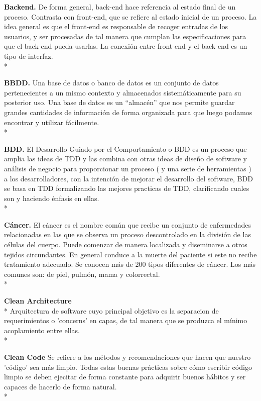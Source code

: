 \documentclass[../pfc.tex]{subfiles}
\begin{document}
	\textbf{Backend.}
	De forma general, back-end hace referencia al estado final de un proceso. Contrasta con front-end, que se refiere al estado inicial de un proceso. 
	La idea general es que el front-end es responsable de recoger entradas de los usuarios, y ser procesadas de tal manera que cumplan las especificaciones para que el back-end pueda usarlas. La conexión entre front-end y el back-end es un tipo de interfaz.\\*
	
	\textbf{BBDD.}
	Una base de datos o banco de datos es un conjunto de datos pertenecientes a un mismo contexto y almacenados sistemáticamente para su posterior uso. Una base de datos es un “almacén” que nos permite guardar grandes cantidades de información de forma organizada para que luego podamos encontrar y utilizar fácilmente.\\*
	
	\textbf{BDD.}
	El Desarrollo Guiado por el Comportamiento o BDD es un proceso que amplia las ideas de TDD y las combina con otras ideas de diseño de software y análisis de negocio para proporcionar un proceso ( y una serie de herramientas ) a los desarrolladores, con la intención de mejorar el desarrollo del software, BDD se basa en TDD formalizando las mejores practicas de TDD, clarificando cuales son y haciendo énfasis en ellas.\\*
	
	\textbf{Cáncer.}
	El cáncer es el nombre común que recibe un conjunto de enfermedades relacionadas en las que se observa un proceso descontrolado en la división de las células del cuerpo. Puede comenzar de manera localizada y diseminarse a otros tejidos circundantes. En general conduce a la muerte del paciente si este no recibe tratamiento adecuado. Se conocen más de 200 tipos diferentes de cáncer. Los más comunes son: de piel, pulmón, mama y colorrectal.\\*
	
	\textbf{Clean Architecture}\\*
	Arquitectura de software cuyo principal objetivo es la separacion de requerimientos o 'concerns' en capas, de tal manera que se produzca el mínimo acoplamiento entre ellas.\\*
	
	\textbf{Clean Code}
	Se refiere a los métodos y recomendaciones que hacen que nuestro 'código' sea más limpio. Todas estas buenas prácticas sobre cómo escribir código limpio se deben ejecitar de forma constante para adquirir buenos hábitos y ser capaces de hacerlo de forma natural.\\* 
	
\end{document}
